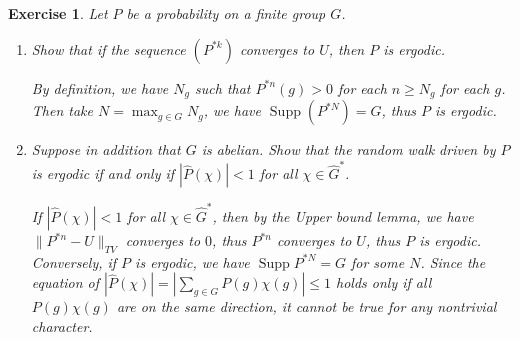 \documentclass[11pt]{report}
\theoremstyle{mythm}
\let\oldendproof\endproof
\renewenvironment{proof}[1][\proofname]{%
  \oldproof[\normalfont \bfseries #1]%
}{\oldendproof}
\newtheorem{exercise}{Exercise}[chapter]
\renewcommand*{\proofname}{Proof}
\theoremstyle{myans}
\DeclareMathOperator{\Supp}{Supp}
\newcommand{\norm}[1]{\| #1 \|}
\begin{document}
\setcounter{exercise}{7}
\begin{exercise}
  Let $P$ be a probability on a finite group $G$.
  \begin{enumerate}[label=(\alph*)]
    \item Show that if the sequence $(P^{*k} )$ converges to $U$, then $P$ is ergodic.
    \begin{proof}
      By definition, we have $N_g$ such that $P^{*n}(g) > 0$ for each $n \geq N_g$ for each $g$.
      Then take $N = \max_{g\in G} N_g$, we have $\Supp(P^{*N}) = G$, thus $P$ is ergodic.
    \end{proof}
    \item Suppose in addition that $G$ is abelian. Show that the random walk driven by $P$
    is ergodic if and only if $|\hat P(\chi)| < 1$ for all $\chi \in \hat G^{*}$. 
    \begin{proof}
      If $|\hat P(\chi)| < 1$ for all $\chi \in \hat G^{*}$, then by the Upper bound lemma,
      we have $\norm{P^{*n}-U}_{TV}$ converges to $0$, thus $P^{*n}$ converges to $U$,
      thus $P$ is ergodic. Conversely, if $P$ is ergodic, we have $\Supp P^{*N} = G$ for some $N$.
      Since the equation of $|\hat P(\chi)| = |\sum_{g\in G} P(g)\chi(g)| \leq 1$ holds only if
      all $P(g)\chi(g)$ are on the same direction, it cannot be true for any nontrivial
      character.
    \end{proof}
  \end{enumerate}
\end{exercise}
\end{document}
